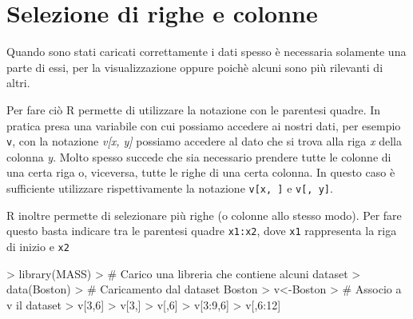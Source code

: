 \documentclass{article}
\begin{document}

\section{Selezione di righe e colonne}
Quando sono stati caricati correttamente i dati spesso è necessaria solamente
una parte di essi, per la visualizzazione oppure poichè alcuni sono più 
rilevanti di altri. 

Per fare ciò R permette di utilizzare la notazione con le parentesi quadre.
In pratica presa una variabile con cui possiamo accedere ai nostri dati, 
per esempio \texttt{v}, con la notazione \textit{v[x, y]} possiamo accedere
al dato che si trova alla riga \textit{x} della colonna \textit{y}. Molto 
spesso succede che sia necessario prendere tutte le colonne di una certa riga
o, viceversa, tutte le righe di una certa colonna. In questo caso è sufficiente
utilizzare rispettivamente la notazione \texttt{v[x, ]} e \texttt{v[, y]}.

R inoltre permette di selezionare più righe (o colonne allo stesso modo). Per 
fare questo basta indicare tra le parentesi quadre \texttt{x1:x2}, dove 
\texttt{x1} rappresenta la riga di inizio e \texttt{x2}

\begin{Schunk}
\begin{Sinput}
> library(MASS)
> # Carico una libreria che contiene alcuni dataset
> data(Boston)
> # Caricamento dal dataset Boston
> v<-Boston
> # Associo a v il dataset
> v[3,6]
> v[3,]
> v[,6]
> v[3:9,6]
> v[,6:12]
\end{Sinput}
\end{Schunk}
\end{document}
